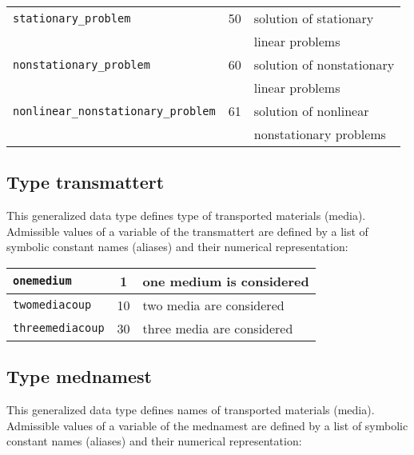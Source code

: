 \begin{center}
\begin{tabular}{|l|c|l|}
\hline
{\tt stationary\_problem} & 50 & solution of stationary
\\
 & & linear problems
\\ \hline
{\tt nonstationary\_problem} & 60 & solution of nonstationary
\\
 & & linear problems
\\ \hline
{\tt nonlinear\_nonstationary\_problem} & 61 & solution of nonlinear
\\
 & & nonstationary problems
\\ \hline
\end{tabular}
\end{center}

\subsection{Type {\sf transmattert}}
\label{secttransmattert}

This generalized data type defines type of transported materials (media).
Admissible values of a variable of the {\sf transmattert} are defined by a list of symbolic constant names (aliases)
and their numerical representation:

\begin{center}
\begin{tabular}{|l|c|l|}
\hline
{\tt onemedium} & 1 & one medium is considered
\\ \hline
{\tt twomediacoup} & 10 & two media are considered
\\ \hline
{\tt threemediacoup} & 30 & three media are considered
\\ \hline
\end{tabular}
\end{center}

\subsection{Type {\sf mednamest}}
\label{sectmednamest}

This generalized data type defines names of transported materials (media).
Admissible values of a variable of the {\sf mednamest} are defined by a list of symbolic constant names (aliases)
and their numerical representation:


